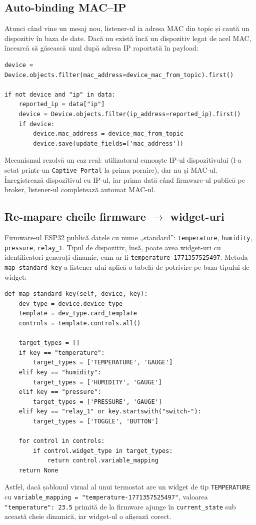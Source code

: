 \subsection{Auto-binding MAC--IP}
Atunci când vine un mesaj nou, listener-ul ia adresa MAC din topic și caută un dispozitiv în baza de date. Dacă nu există încă un dispozitiv legat de acel MAC, încearcă să găsească unul după adresa IP raportată în payload:
\begin{verbatim}
device = Device.objects.filter(mac_address=device_mac_from_topic).first()

if not device and "ip" in data:
    reported_ip = data["ip"]
    device = Device.objects.filter(ip_address=reported_ip).first()
    if device:
        device.mac_address = device_mac_from_topic
        device.save(update_fields=['mac_address'])
\end{verbatim}
Mecanismul rezolvă un caz real: utilizatorul cunoaște IP-ul dispozitivului (l-a setat printr-un \texttt{Captive Portal} la prima pornire), dar nu și MAC-ul. Înregistrează dispozitivul cu IP-ul, iar prima dată când firmware-ul publică pe broker, listener-ul completează automat MAC-ul.

\subsection{Re-mapare cheile firmware $\rightarrow$ widget-uri}
Firmware-ul ESP32 publică datele cu nume „standard”: \texttt{temperature}, \texttt{humidity}, \texttt{pressure}, \texttt{relay\_1}. Tipul de dispozitiv, însă, poate avea widget-uri cu identificatori generați dinamic, cum ar fi \texttt{temperature-1771357525497}. Metoda \texttt{map\_standard\_key} a listener-ului aplică o tabelă de potrivire pe baza tipului de widget:
\begin{verbatim}
def map_standard_key(self, device, key):
    dev_type = device.device_type
    template = dev_type.card_template
    controls = template.controls.all()

    target_types = []
    if key == "temperature":
        target_types = ['TEMPERATURE', 'GAUGE']
    elif key == "humidity":
        target_types = ['HUMIDITY', 'GAUGE']
    elif key == "pressure":
        target_types = ['PRESSURE', 'GAUGE']
    elif key == "relay_1" or key.startswith("switch-"):
        target_types = ['TOGGLE', 'BUTTON']

    for control in controls:
        if control.widget_type in target_types:
            return control.variable_mapping
    return None
\end{verbatim}
Astfel, dacă șablonul vizual al unui termostat are un widget de tip \texttt{TEMPERATURE} cu \texttt{variable\_mapping = "temperature-1771357525497"}, valoarea \texttt{"temperature": 23.5} primită de la firmware ajunge în \texttt{current\_state} sub această cheie dinamică, iar widget-ul o afișează corect.

